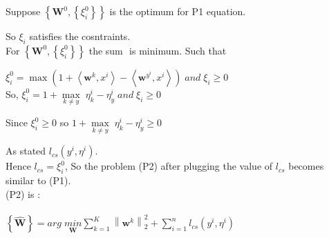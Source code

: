 \documentclass[a4paper,11pt]{article}
\begin{document}
\begin{mlsolution}
Suppose \begin{math} \left \{ \textbf{W}^{0}, \left \{ \xi _{i}^{0} \right \} \right \} \end{math} is the optimum for P1 equation.

So \begin{math}\xi_{i}\end{math} satisfies the cosntraints.\\

For \begin{math} \left \{ \textbf{W}^{0}, \left \{ \xi _{i}^{0} \right \} \right \} \end{math} the sum \begin{math}  \end{math} is minimum. Such that 

\begin{math}\xi_{i}^{0} =  \max \left ( 1 + \left \langle \textbf{w}^{k}, x^{i} \right \rangle - \left \langle \textbf{w}^{y^{i}}, x^{i} \right \rangle\right )  \;and\; \xi_{i}\geq 0
\end{math}\\

So, 
\begin{math}\xi_{i}^{0} =   1 + \underset{k\neq y}{\max} \;\eta_{k}^{i} - \eta_{y} ^{i}  \;and\; \xi_{i}\geq 0\end{math}

Since \begin{math}\xi_{i}^{0} \geq 0\end{math}  \;so \; \begin{math} 1 + \underset{k\neq y}{\max} \;\eta_{k}^{i} - \eta_{y} ^{i} \geq 0 \end{math}

As stated \begin{math} l_{cs}\left ( y^{i},\eta ^{i} \right ) \end{math}.\\ 

Hence \begin{math} l_{cs} = \xi_{i}^{0}\end{math}, So the problem (P2) after plugging the value of \begin{math} l_{cs} \end{math} becomes similar to (P1).\\

(P2) is :\\\\
\begin{math}\left \{ \widehat{\textbf{W}} \right \} = \underset{\textbf{}}{arg} \; \underset{  \textbf{W}}{min} \sum_{k=1}^{K} \left \| \textbf{w}^{k} \right \|^{2}_{2} + \sum_{i=1}^{n} l _{cs}\left ( y^{i}, \eta ^{i} \right )\end{math}


\end{mlsolution}
\end{document}
